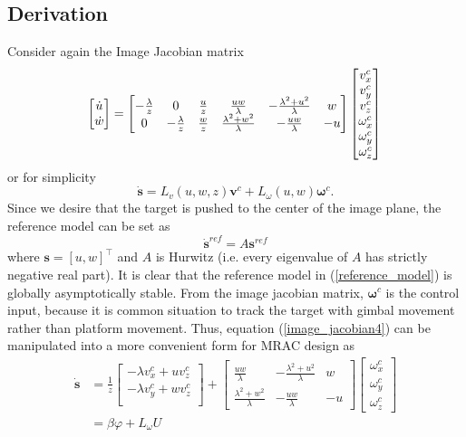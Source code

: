 \subsection{Derivation}
Consider again the Image Jacobian matrix
\begin{equation}
\begin{bmatrix}
\dot{u} \\ \dot{w}
\end{bmatrix}
=\begin{bmatrix}
-\frac{\lambda}{z} & 0 & \frac{u}{z} & \frac{uw}{\lambda} & -\frac{\lambda^2+u^2}{\lambda} & w \\
0 & -\frac{\lambda}{z} & \frac{w}{z} & \frac{\lambda^2+w^2}{\lambda} & -\frac{uw}{\lambda} & -u
\end{bmatrix}
\begin{bmatrix}
v_x^c \\ v_y^c \\ v_z^c \\
\omega_x^c \\ \omega_y^c \\ \omega_z^c
\end{bmatrix}\\
\label{image_jacobian4}
\end{equation}
or for simplicity
\begin{equation}
\mathbf{\dot{s}}=L_v(u,w,z)\mathbf{v}^c+L_{\omega}(u,w)\mathbf{\omega}^c.
\end{equation}
Since we desire that the target is pushed to the center of the image plane, the reference model can be set as 
\begin{equation}
\mathbf{\dot{s}}^{ref}=A\mathbf{s}^{ref}
\label{reference_model}
\end{equation}
where $\mathbf{s}=[u, w]^\top$ and $A$ is Hurwitz (i.e. every eigenvalue of $A$ has strictly negative real part). It is clear that the reference model in (\ref{reference_model}) is globally asymptotically stable. From the image jacobian matrix, $\mathbf{\omega}^c$ is the control input, because it is common situation to track the target with gimbal movement rather than platform movement. Thus, equation (\ref{image_jacobian4}) can be manipulated into a more convenient form for MRAC design as 
\begin{align}
\mathbf{\dot{s}}
&=\frac{1}{z}
\begin{bmatrix}
-\lambda v_x^c+uv_z^c \\
-\lambda v_y^c+wv_z^c \\
\end{bmatrix}
+\begin{bmatrix}
\frac{uw}{\lambda} & -\frac{\lambda^2+u^2}{\lambda} & w \\
\frac{\lambda^2+w^2}{\lambda} & -\frac{uw}{\lambda} & -u
\end{bmatrix}
\begin{bmatrix}
\omega_x^c \\ \omega_y^c \\ \omega_z^c
\end{bmatrix}
\\&=\beta\varphi + L_{\omega}U
\label{adaptive_image_jacobian}
\end{align}

